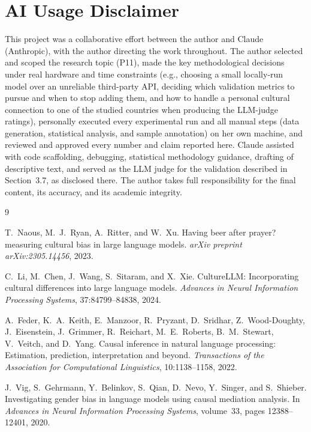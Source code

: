 \documentclass[10pt,twocolumn]{article}
\begin{document}
\section*{AI Usage Disclaimer}

This project was a collaborative effort between the author and Claude
(Anthropic), with the author directing the work throughout. The author
selected and scoped the research topic (P11), made the key methodological
decisions under real hardware and time constraints (e.g., choosing a small
locally-run model over an unreliable third-party API, deciding which
validation metrics to pursue and when to stop adding them, and how to
handle a personal cultural connection to one of the studied countries when
producing the LLM-judge ratings), personally executed every experimental
run and all manual steps (data generation, statistical analysis, and
sample annotation) on her own machine, and reviewed and approved every
number and claim reported here. Claude assisted with code scaffolding,
debugging, statistical methodology guidance, drafting of descriptive text,
and served as the LLM judge for the validation described in
Section~3.7, as disclosed there. The author takes full responsibility for
the final content, its accuracy, and its academic integrity.

\begin{thebibliography}{9}

T.~Naous, M.~J.~Ryan, A.~Ritter, and W.~Xu.
\newblock Having beer after prayer? measuring cultural bias in large language models.
\newblock \emph{arXiv preprint arXiv:2305.14456}, 2023.

C.~Li, M.~Chen, J.~Wang, S.~Sitaram, and X.~Xie.
\newblock CultureLLM: Incorporating cultural differences into large language models.
\newblock \emph{Advances in Neural Information Processing Systems}, 37:84799--84838, 2024.

A.~Feder, K.~A.~Keith, E.~Manzoor, R.~Pryzant, D.~Sridhar, Z.~Wood-Doughty,
J.~Eisenstein, J.~Grimmer, R.~Reichart, M.~E.~Roberts, B.~M.~Stewart,
V.~Veitch, and D.~Yang.
\newblock Causal inference in natural language processing: Estimation, prediction, interpretation and beyond.
\newblock \emph{Transactions of the Association for Computational Linguistics}, 10:1138--1158, 2022.

J.~Vig, S.~Gehrmann, Y.~Belinkov, S.~Qian, D.~Nevo, Y.~Singer, and S.~Shieber.
\newblock Investigating gender bias in language models using causal mediation analysis.
\newblock In \emph{Advances in Neural Information Processing Systems}, volume~33, pages 12388--12401, 2020.

\end{thebibliography}
\end{document}
